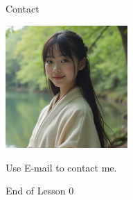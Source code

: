 \documentclass{beamer}
\begin{document}
\begin{frame}{Contact}
\begin{center}
\includegraphics[width=0.35\textwidth]{kg.png}
\end{center}
\begin{center}
Use E-mail to contact me.
\end{center}
\end{frame}
\begin{frame}{}
\begin{center}
\Large{End of Lesson 0}
\end{center}
\end{frame}
\end{document}
